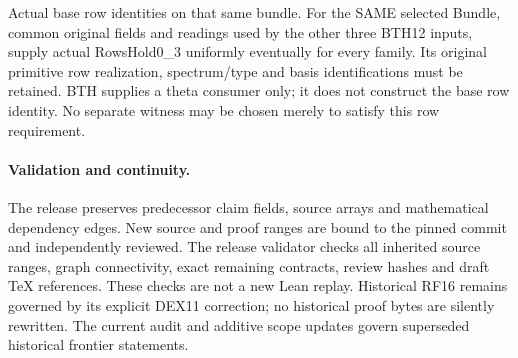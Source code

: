 \begin{description}[style=nextline]
\item[35. SLR\_BASE\_ROWS\_PRODUCER --- C] Actual base row identities on that same bundle. For the SAME selected Bundle, common original fields and readings used by the other three BTH12 inputs, supply actual RowsHold0\_3 uniformly eventually for every family. Its original primitive row realization, spectrum/type and basis identifications must be retained. BTH supplies a theta consumer only; it does not construct the base row identity. No separate witness may be chosen merely to satisfy this row requirement.

\end{description}

\paragraph{Validation and continuity.}
The release preserves predecessor claim fields, source arrays and
mathematical dependency edges. New source and proof ranges are bound
to the pinned commit and independently reviewed. The release
validator checks all inherited source ranges, graph connectivity,
exact remaining contracts, review hashes and draft TeX references.
These checks are not a new Lean replay. Historical RF16 remains
governed by its explicit DEX11 correction; no historical proof
bytes are silently rewritten. The current audit and additive scope
updates govern superseded historical frontier statements.
